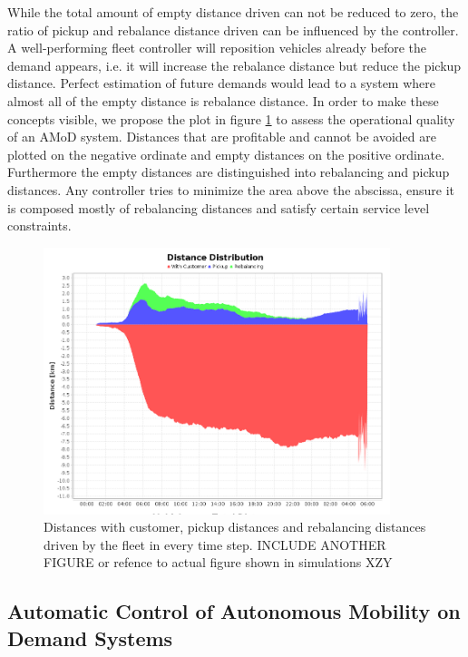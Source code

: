 While the total amount of empty distance driven can not be reduced to zero, the ratio of pickup and rebalance distance driven can be influenced by the controller. A well-performing fleet controller will reposition vehicles already before the demand appears, i.e. it will increase the rebalance distance but reduce the pickup distance. Perfect estimation of future demands would lead to a system where almost all of the empty distance is rebalance distance. In order to make these concepts visible, we propose the plot in figure \ref{fig:distancePlot} to assess the operational quality of an AMoD system. Distances that are profitable and cannot be avoided are plotted on the negative ordinate and empty distances on the positive ordinate. Furthermore the empty distances are distinguished into rebalancing and pickup distances. Any controller tries to minimize the area above the abscissa, ensure it is composed mostly of rebalancing distances and satisfy certain service level constraints.



\begin{figure}[h]
\begin{center}\includegraphics[width=0.9\textwidth]{figures/distancePlot.png}\end{center}
\caption{Distances with customer, pickup distances and rebalancing distances driven by the fleet in every time step. INCLUDE ANOTHER FIGURE or refence to actual figure shown in simulations XZY}
\label{fig:distancePlot}
\end{figure}




\subsection{Automatic Control of Autonomous Mobility on Demand Systems}
\label{subsec:automaticControl}

